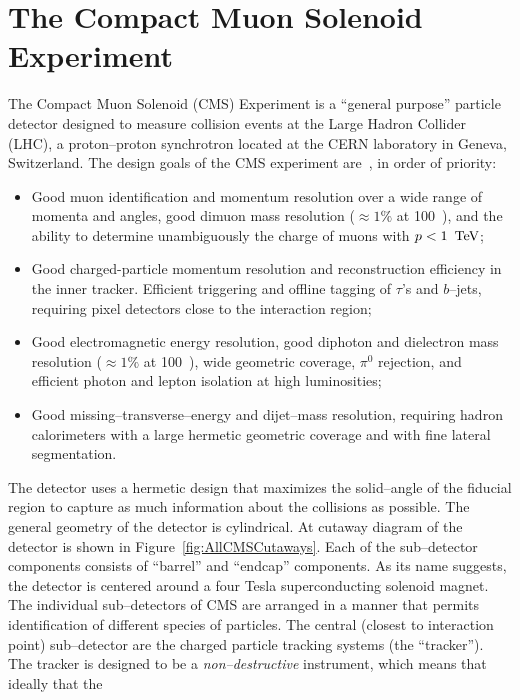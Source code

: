 \ifx\master\undefined\fi
\chapter{The Compact Muon Solenoid Experiment}
\label{ch:detector}
%

The Compact Muon Solenoid (CMS) Experiment is a ``general purpose'' particle
detector designed to measure collision events at the Large Hadron Collider
(LHC), a proton--proton synchrotron located at the CERN laboratory in Geneva,
Switzerland.  The design goals of the CMS experiment are~\cite{CMSExperiment},
in order of priority:
\begin{itemize}
  \item Good muon identification and momentum resolution over a wide range of
    momenta and angles, good dimuon mass resolution ($\approx 1\%$ at 100~\GeV),
    and the ability to determine unambiguously the charge of muons with $p <
    1~\,\text{Te\hspace{-.08em}V}$;
  \item Good charged-particle momentum resolution and reconstruction efficiency
    in the inner tracker. Efficient triggering and offline tagging of $\tau$'s and
    $b$--jets, requiring pixel detectors close to the interaction region;
  \item Good electromagnetic energy resolution, good diphoton and dielectron
    mass resolution ($\approx 1\%$ at 100~\GeV), wide geometric coverage,
    $\pi^0$ rejection, and efficient photon and lepton isolation at high
    luminosities;
  \item Good missing--transverse--energy and dijet--mass resolution, requiring
    hadron calorimeters with a large hermetic geometric coverage and with fine
    lateral segmentation.
\end{itemize}
The detector uses a hermetic design that maximizes the
solid--angle of the fiducial region to capture as much information about the
collisions as possible.  The general geometry of the detector is cylindrical.
At cutaway diagram of the detector is shown in Figure~\ref{fig:AllCMSCutaways}.
Each of the sub--detector components consists of ``barrel'' and ``endcap''
components.  As its name suggests, the detector is centered around a four Tesla
superconducting solenoid magnet.  The individual sub--detectors of CMS are
arranged in a manner that permits identification of different species of
particles.  The central (closest to interaction point) sub--detector are the
charged particle tracking systems (the ``tracker'').  The tracker is designed to
be a \emph{non--destructive} instrument, which means that ideally that the

